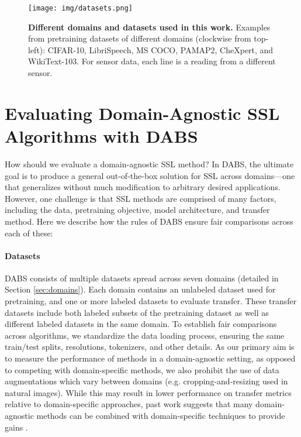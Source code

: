 \documentclass{article}
\begin{document}
\begin{figure}
    \centering
    \texttt{[image: img/datasets.png]}
    \caption{\textbf{Different domains and datasets used in this work.} Examples from pretraining datasets of different domains (clockwise from top-left): CIFAR-10, LibriSpeech, MS COCO, PAMAP2, CheXpert, and WikiText-103.  For sensor data, each line is a reading from a different sensor.}
    \label{fig:domains}
\end{figure}


\section{Evaluating Domain-Agnostic SSL Algorithms with DABS}
\label{sec:rules}

How should we evaluate a domain-agnostic SSL method? In DABS, the ultimate goal is to produce a general out-of-the-box solution for SSL across domains---one that generalizes without much modification to arbitrary desired applications. However, one challenge is that SSL methods are comprised of many factors, including the data, pretraining objective, model architecture, and transfer method. Here we describe how the rules of DABS ensure fair comparisons across each of these: 

\paragraph{Datasets} DABS consists of multiple datasets spread across seven domains (detailed in Section \ref{sec:domains}). Each domain contains an unlabeled dataset used for pretraining, and one or more labeled datasets to evaluate transfer. These transfer datasets include both labeled subsets of the pretraining dataset as well as different labeled datasets in the same domain. To establish fair comparisons across algorithms, we standardize the data loading process, ensuring the same train/test splits, resolutions, tokenizers, and other details. As our primary aim is to measure the performance of methods in a domain-agnostic setting, as opposed to competing with domain-specific methods, we also prohibit the use of data augmentations which vary between domains (e.g. cropping-and-resizing used in natural images). While this may result in lower performance on transfer metrics relative to domain-specific approaches, past work suggests that many domain-agnostic methods can be combined with domain-specific techniques to provide gains \citep{Tamkin2020ViewmakerNL, Lee2021iMIXAD, Verma2020TowardsDC}. 
\end{document}
